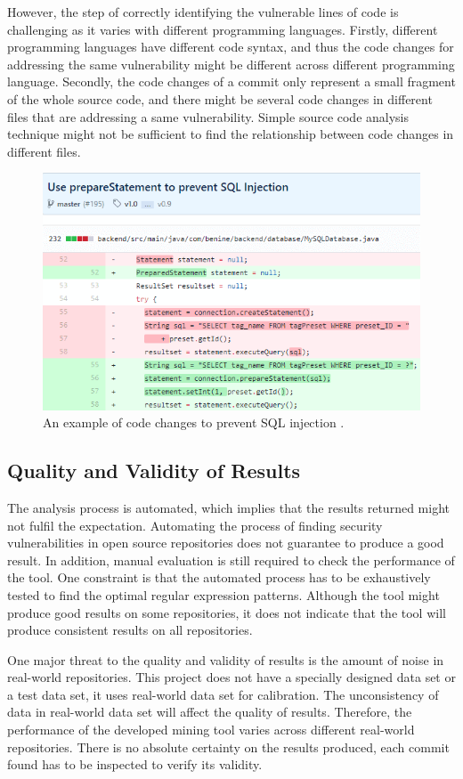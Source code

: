 \documentclass[12pt, a4paper]{report}
\begin{document}
However, the step of correctly identifying the vulnerable lines of code is challenging as it varies
with different programming languages. Firstly, different programming languages have different code
syntax, and thus the code changes for addressing the same vulnerability might be different across
different programming language. Secondly, the code changes of a commit only represent a small
fragment of the whole source code, and there might be several code changes in different files that
are addressing a same vulnerability. Simple source code analysis technique might not be sufficient
to find the relationship between code changes in different files.

\begin{figure}[H]
  \centering
  \includegraphics[width=.75\textwidth]{images/code_diff.png}
  \caption{An example of code changes to prevent SQL injection \cite{code_diff}.}
  \label{figure:code_diff}
\end{figure}

\subsection{Quality and Validity of Results} \label{subsec:quality_and_validity}
The analysis process is automated, which implies that the results returned might not fulfil the
expectation. Automating the process of finding security vulnerabilities in open source repositories
does not guarantee to produce a good result. In addition, manual evaluation is still required to
check the performance of the tool. One constraint is that the automated process has to be
exhaustively tested to find the optimal regular expression patterns. Although the tool might produce
good results on some repositories, it does not indicate that the tool will produce consistent
results on all repositories.

One major threat to the quality and validity of results is the amount of noise in real-world
repositories. This project does not have a specially designed data set or a test data set, it uses
real-world data set for calibration. The unconsistency of data in real-world data set will affect
the quality of results. Therefore, the performance of the developed mining tool varies across
different real-world repositories. There is no absolute certainty on the results produced, each
commit found has to be inspected to verify its validity.
\end{document}
